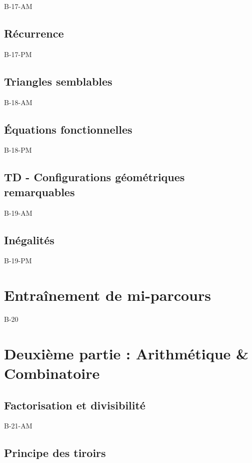 \documentclass[poly,trombi]{valbonne}
\begin{document}
{B-17-AM}

\subsection{Récurrence}

{B-17-PM}

\subsection{Triangles semblables}

{B-18-AM}

\subsection{Équations fonctionnelles}

{B-18-PM}

\subsection{TD - Configurations géométriques remarquables}

{B-19-AM}

\subsection{Inégalités}

{B-19-PM}


\section{Entraînement de mi-parcours}

{B-20}


\section{Deuxième partie : Arithmétique \& Combinatoire}

\subsection{Factorisation et divisibilité}

{B-21-AM}

\subsection{Principe des tiroirs}
\end{document}

